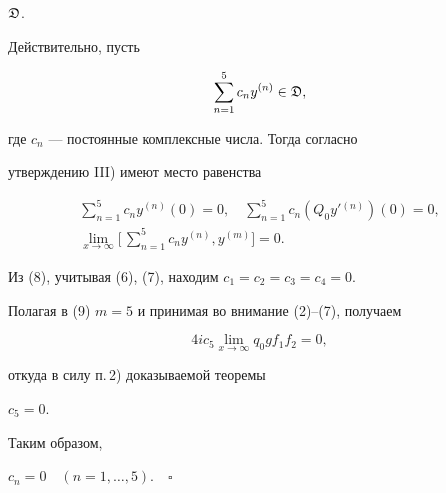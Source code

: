 $\frak D$. 


Действительно, пусть 


$$ 


\sum^5_{n=1}c_n y^{(n)}\in\frak D, 


$$ 


где $c_n$ --- постоянные комплексные числа. Тогда согласно


утверждению III) имеют место равенства 


\begin{gather} 


\sum^5_{n=1}c_n y^{(n)}(0)=0,\quad 


\sum^5_{n=1}c_n(Q_0y'{}^{(n)})(0)=0,\\ 


\lim_{x\to\infty}\bigg[\,\sum^5_{n=1}c_n y^{(n)},y^{(m)} 


\bigg]=0. 


\end{gather} 


Из (8), учитывая (6), (7), находим $c_1=c_2=c_3=c_4=0$. 


Полагая в (9) $m=5$ и принимая во внимание (2)--(7), получаем 


$$ 


4i c_5\lim_{x\to\infty}q_0g f_1f_2=0, 


$$ 


откуда в силу п.\,2) доказываемой теоремы


$c_5=0$. 


Таким образом, 


$c_n=0\quad (n=1,\dotsc,5).\quad\square$ 


 


